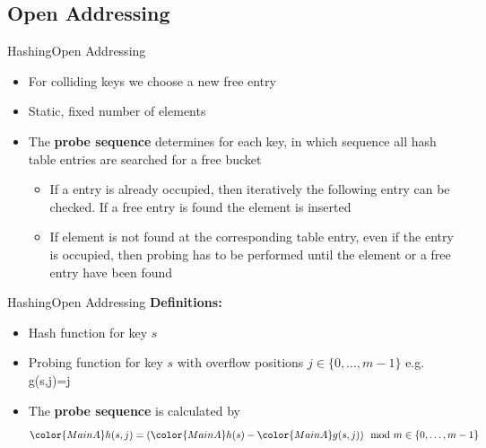 
\subsection{Open Addressing}

\begin{frame}{Hashing}{Open Addressing}
  \begin{itemize}
    \item<1->
      For colliding keys we choose a new free entry
    \item<2->
      Static, fixed number of elements
    \item<3->
      The \textbf{probe sequence} determines for each key, in which sequence
      all hash table entries are searched for a free bucket
      \begin{itemize}
      \item<4->
        If a entry is already occupied, then iteratively the
        {\color{MainA}following entry} can be checked.
        If a free entry is found the element is inserted
      \item<5->
        If element is not found at the corresponding table entry, even if
        the entry is occupied, then probing has to be performed until
        the element or a free entry have been found
    \end{itemize}
  \end{itemize}
\end{frame}


\begin{frame}{Hashing}{Open Addressing}
  \textbf{Definitions:}
  \begin{itemize}
    \item<2->[\color{MainA}$h(s)$]
      Hash function for key {\color{MainA}$s$}
    \item<3->[\color{MainA}$g(s,j)$]
      Probing function for key {\color{MainA}$s$}
      with overflow positions {\color{MainA}$j \in \{0,\dots,m-1\}$}
      e.g. {\color{MainA}g(s,j)=j}
    \item<4->
      The \textbf{probe sequence } is calculated by
      \begin{displaymath}
        {\color{MainA}h(s,j)}
        = ({\color{MainA}h(s)} - {\color{MainA}g(s,j)})
        \mod m \in \{0,\dots,m-1\}
      \end{displaymath}
  \end{itemize}
  \vspace{-1em}
  \begin{center}
    \begin{adjustbox}{width=0.75\linewidth}%
    \end{adjustbox}
  \end{center}
\end{frame}

